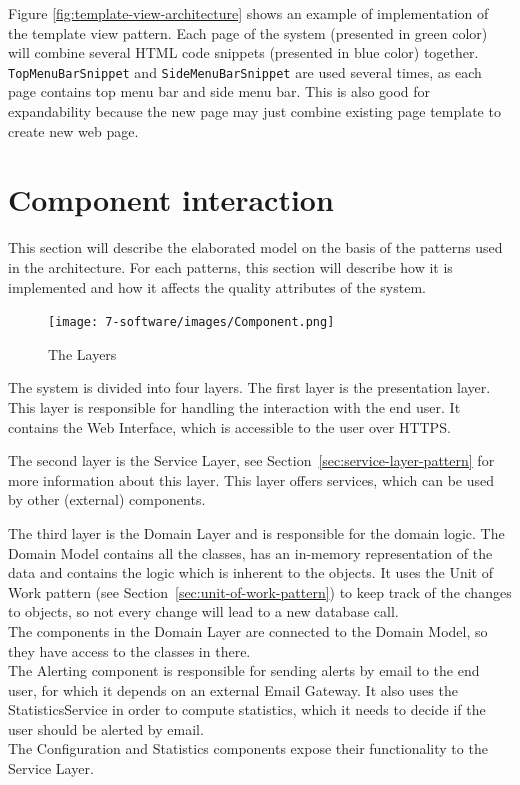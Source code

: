 Figure \ref{fig:template-view-architecture} shows an example of implementation of the template view pattern. Each page of the system (presented in green color) will combine several HTML code snippets (presented in blue color) together. \texttt{TopMenuBarSnippet} and \texttt{SideMenuBarSnippet} are used several times, as each page contains top menu bar and side menu bar. This is also good for expandability because the new page may just combine existing page template to create new web page.


\section{Component interaction}
This section will describe the elaborated model on the basis of the patterns used in the architecture. For each patterns, this section will describe how it is implemented and how it affects the quality attributes of the system.

\begin{figure}[H]
\centering
\texttt{[image: 7-software/images/Component.png]}
\caption{The Layers}
\label{fig:layers}
\end{figure}
The system is divided into four layers. The first layer is the presentation layer. This layer is responsible for handling the interaction with the end user. It contains the Web Interface, which is accessible to the user over HTTPS.

The second layer is the Service Layer, see Section~\ref{sec:service-layer-pattern} for more information about this layer. This layer offers services, which can be used by other (external) components.

The third layer is the Domain Layer and is responsible for the domain logic. The Domain Model contains all the classes, has an in-memory representation of the data and contains the logic which is inherent to the objects.
It uses the Unit of Work pattern (see Section~\ref{sec:unit-of-work-pattern}) to keep track of the changes to objects, so not every change will lead to a new database call. \\
The components in the Domain Layer are connected to the Domain Model, so they have access to the classes in there. \\
The Alerting component is responsible for sending alerts by email to the end user, for which it depends on an external Email Gateway. It also uses the StatisticsService in order to compute statistics, which it needs to decide if the user should be alerted by email. \\
The Configuration and Statistics components expose their functionality to the Service Layer.

